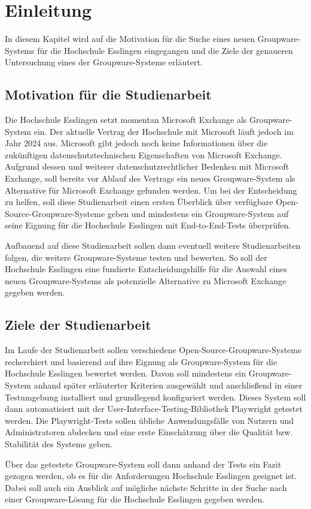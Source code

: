 
\chapter{Einleitung}

In diesem Kapitel wird auf die Motivation für die Suche eines neuen Groupware-Systems für die Hochschule Esslingen eingegangen und die Ziele der genaueren Untersuchung eines der Groupware-Systeme erläutert.


\section{Motivation für die Studienarbeit}

Die Hochschule Esslingen setzt momentan Microsoft Exchange als Groupware-System ein.
Der aktuelle Vertrag der Hochschule mit Microsoft läuft jedoch im Jahr 2024 aus.
Microsoft gibt jedoch noch keine Informationen über die zukünftigen datenschutztechnischen Eigenschaften von Microsoft Exchange.
Aufgrund dessen und weiterer datenschutzrechtlicher Bedenken mit Microsoft Exchange, soll bereits vor Ablauf des Vertrags ein neues Groupware-System als Alternative für Microsoft Exchange gefunden werden.
Um bei der Entscheidung zu helfen, soll diese Studienarbeit einen ersten Überblick über verfügbare Open-Source-Groupware-Systeme geben und mindestens ein Groupware-System auf seine Eignung für die Hochschule Esslingen mit End-to-End-Tests überprüfen.

Aufbauend auf diese Studienarbeit sollen dann eventuell weitere Studienarbeiten folgen, die weitere Groupware-Systeme testen und bewerten.
So soll der Hochschule Esslingen eine fundierte Entscheidungshilfe für die Auswahl eines neuen Groupware-Systems als potenzielle Alternative zu Microsoft Exchange gegeben werden.


\section{Ziele der Studienarbeit}

Im Laufe der Studienarbeit sollen verschiedene Open-Source-Groupware-Systeme recherchiert und basierend auf ihre Eignung als Groupware-System für die Hochschule Esslingen bewertet werden.
Davon soll mindestens ein Groupware-System anhand später erläuterter Kriterien ausgewählt und anschließend in einer Testumgebung installiert und grundlegend konfiguriert werden.
Dieses System soll dann automatisiert mit der User-Interface-Testing-Bibliothek Playwright getestet werden.
Die Playwright-Tests sollen übliche Anwendungsfälle von Nutzern und Administratoren abdecken und eine erste Einschätzung über die Qualität bzw. Stabilität des Systems geben.

Über das getestete Groupware-System soll dann anhand der Tests ein Fazit gezogen werden, ob es für die Anforderungen Hochschule Esslingen geeignet ist.
Dabei soll auch ein Ausblick auf mögliche nächste Schritte in der Suche nach einer Groupware-Lösung für die Hochschule Esslingen gegeben werden.


